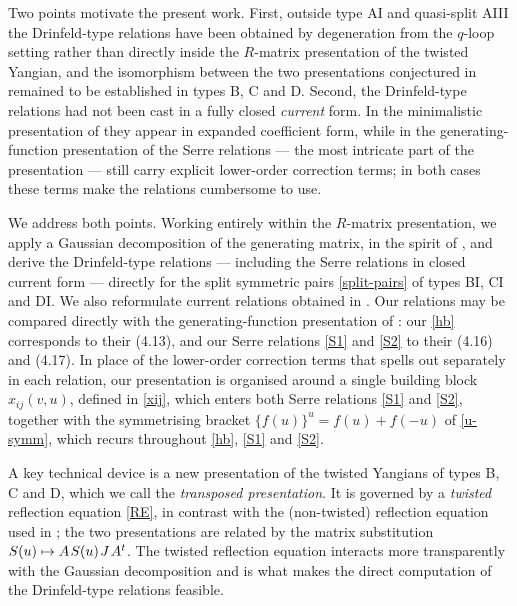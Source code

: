 \documentclass{amsart}
\numberwithin{equation}{section}
\theoremstyle{remark}
\renewcommand{\,}{\kern 0.1em} %
\begin{document}
Two points motivate the present work. First, outside type AI and quasi-split AIII the Drinfeld-type relations have been obtained by degeneration from the $q$-loop setting rather than directly inside the $R$-matrix presentation of the twisted Yangian, and the isomorphism between the two presentations conjectured in \cite{LWZ25b} remained to be established in types B, C and D. 
Second, the Drinfeld-type relations had not been cast in a fully closed \emph{current} form. In the minimalistic presentation of \cite{Lu26a} they appear in expanded coefficient form, while in the generating-function presentation of \cite[\S4.3]{LWZ25b} the Serre relations --- the most intricate part of the presentation --- still carry explicit lower-order correction terms; in both cases these terms make the relations cumbersome to use.

We address both points. Working entirely within the $R$-matrix presentation, we apply a Gaussian decomposition of the generating matrix, in the spirit of \cite{JLM18, LWZ25a}, and derive the Drinfeld-type relations --- including the Serre relations in closed current form --- directly for the split symmetric pairs \eqref{split-pairs} of types BI, CI and DI. We also reformulate current relations obtained in \cite[Remark~4.12]{LWZ25a}. Our relations may be compared directly with the generating-function presentation of \cite[\S4.3]{LWZ25b}: our \eqref{hb} corresponds to their (4.13), and our Serre relations \eqref{S1} and \eqref{S2} to their (4.16) and (4.17). In place of the lower-order correction terms that \cite{LWZ25b} spells out separately in each relation, our presentation is organised around a single building block $x_{ij}(v,u)$, defined in \eqref{xij}, which enters both Serre relations \eqref{S1} and \eqref{S2}, together with the symmetrising bracket $\{f(u)\}^u = f(u)+f(-u)$ of \eqref{u-symm}, which recurs throughout \eqref{hb}, \eqref{S1} and \eqref{S2}.

A key technical device is a new presentation of the twisted Yangians of types B, C and D, which we call the \emph{transposed presentation}. It is governed by a \emph{twisted} reflection equation \eqref{RE}, in contrast with the (non-twisted) reflection equation used in \cite{GR16}; the two presentations are related by the matrix substitution $S(u) \mapsto A\,S(u)\,J\,A^t$. The twisted reflection equation interacts more transparently with the Gaussian decomposition and is what makes the direct computation of the Drinfeld-type relations feasible.
\end{document}
